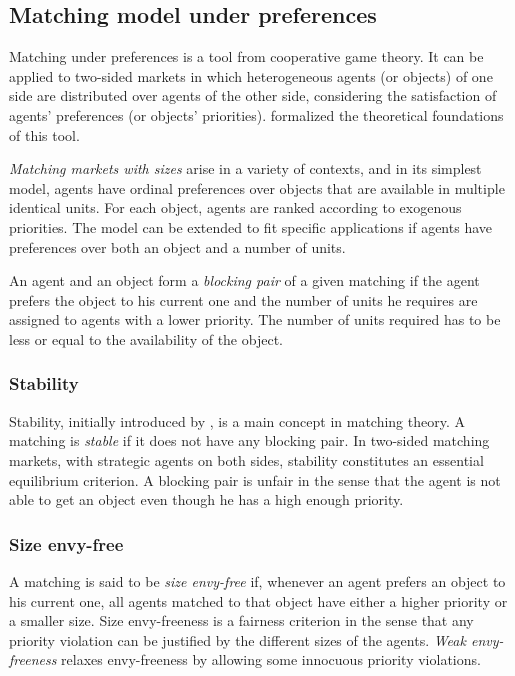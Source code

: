 \subsection{Matching model under preferences}\label{matching-model-under-preferences}%


Matching under preferences is a tool from cooperative game theory. It can be applied to two-sided markets in which heterogeneous agents (or objects) of one side are distributed over agents of the other side, considering the satisfaction of agents’ preferences (or objects’ priorities). \citet{gale_1962} formalized the theoretical foundations of this tool.

\textit{Matching markets with sizes} arise in a variety of contexts, and in its simplest model, agents have ordinal preferences over objects that are available in multiple identical units. For each object, agents are ranked according to exogenous priorities. The model can be extended to fit specific applications if agents have preferences over both an object and a number of units.

An agent and an object form a \textit{blocking pair} of a given matching if the agent prefers the object to his current one and the number of units he requires are assigned to agents with a lower priority. The number of units required has to be less or equal to the availability of the object.


\subsubsection{Stability}%

Stability, initially introduced by \citet{gale_1962}, is a main concept in matching theory. A matching is \textit{stable} if it does not have any blocking pair. In two-sided matching markets, with strategic agents on both sides, stability constitutes an essential equilibrium criterion. A blocking pair is unfair in the sense that the agent is not able to get an object even though he has a high enough priority.


\subsubsection{Size envy-free}%

A matching is said to be \textit{size envy-free} if, whenever an agent prefers an object to his current one, all agents matched to that object have either a higher priority or a smaller size. Size envy-freeness is a fairness criterion in the sense that any priority violation can be justified by the different sizes of the agents. \textit{Weak envy-freeness} relaxes envy-freeness by allowing some innocuous priority violations.


